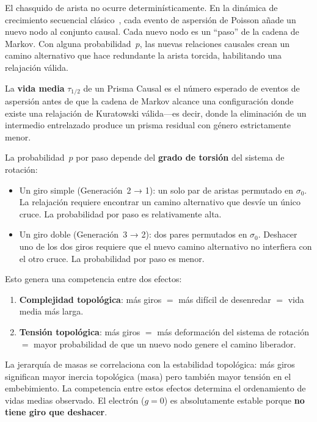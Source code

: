 \documentclass[11pt, a4paper, openany]{book}
\begin{document}
El chasquido de arista no ocurre determinísticamente. En la dinámica
de crecimiento secuencial clásico~\cite{rideout2000}, cada evento de
aspersión de Poisson añade un nuevo nodo al conjunto causal. Cada nuevo
nodo es un ``paso'' de la cadena de Markov. Con alguna probabilidad~$p$,
las nuevas relaciones causales crean un camino alternativo que hace
redundante la arista torcida, habilitando una relajación válida.

\begin{definition}
\label{def:hitting-time}
La \textbf{vida media} $\tau_{1/2}$ de un Prisma Causal es el número
esperado de eventos de aspersión antes de que la cadena de Markov
alcance una configuración donde existe una relajación de Kuratowski
válida---es decir, donde la eliminación de un intermedio entrelazado
produce un prisma residual con género estrictamente menor.
\end{definition}

La probabilidad~$p$ por paso depende del \textbf{grado de torsión} del
sistema de rotación:

\begin{itemize}
  \item Un giro simple (Generación~2 → 1): un solo par de aristas
        permutado en $\sigma_0$. La relajación requiere encontrar un
        camino alternativo que desvíe un único cruce. La probabilidad
        por paso es relativamente alta.
  \item Un giro doble (Generación~3 → 2): dos pares permutados en
        $\sigma_0$. Deshacer uno de los dos giros requiere que el
        nuevo camino alternativo no interfiera con el otro cruce.
        La probabilidad por paso es menor.
\end{itemize}

Esto genera una competencia entre dos efectos:
\begin{enumerate}
  \item \textbf{Complejidad topológica}: más giros $=$ más difícil
        de desenredar $=$ vida media más larga.
  \item \textbf{Tensión topológica}: más giros $=$ más deformación
        del sistema de rotación $=$ mayor probabilidad de que un nuevo
        nodo genere el camino liberador.
\end{enumerate}

\begin{result}[title={Jerarquía de masas y estabilidad topológica}]
La jerarquía de masas se correlaciona con la estabilidad topológica:
más giros significan mayor inercia topológica (masa) pero también
mayor tensión en el embebimiento. La competencia entre estos efectos
determina el ordenamiento de vidas medias observado. El electrón
($g = 0$) es absolutamente estable porque \textbf{no tiene giro que
deshacer}.
\end{result}
\end{document}
